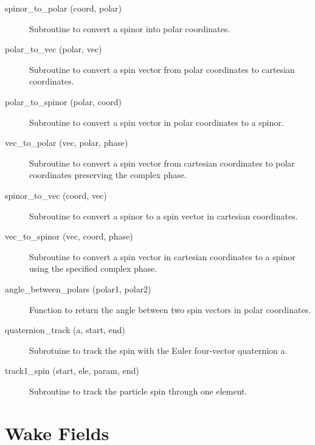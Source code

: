 \begin{description}

\item[spinor_to_polar (coord, polar)] \Newline 
Subroutine to convert a spinor into polar coordinates.

\item[polar_to_vec (polar, vec)] \Newline
Subroutine to convert a spin vector from polar coordinates to cartesian coordinates.

\item[polar_to_spinor (polar, coord)] \Newline
Subroutine to convert a spin vector in polar coordinates to a spinor.

\item[vec_to_polar (vec, polar, phase)] \Newline
Subroutine to convert a spin vector from cartesian coordinates to polar coordinates 
preserving the complex phase.

\item[spinor_to_vec (coord, vec)] \Newline
Subroutine to convert a spinor to a spin vector in cartesian coordinates.

\item[vec_to_spinor (vec, coord, phase)] \Newline
Subroutine to convert a spin vector in cartesian coordinates to a spinor using
the specified complex phase.

\item[angle_between_polars (polar1, polar2)] \Newline
Function to return the angle between two spin vectors in polar coordinates.

\item[quaternion_track (a, start, end)] \Newline
Subrotuine to track the spin with the Euler four-vector quaternion a.

\item[track1_spin (start, ele, param, end)] \Newline
Subroutine to track the particle spin through one element.

\end{description}

\section{Wake Fields}
\label{r:wake}    


